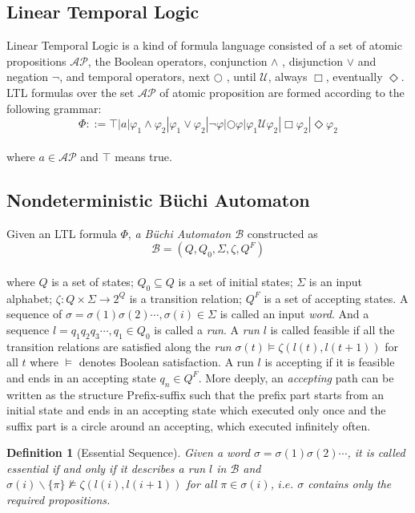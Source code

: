 \documentclass[journal]{IEEEtran}
\newtheorem{definition}{Definition}
\begin{document}
\subsection{Linear Temporal Logic}
Linear Temporal Logic is a kind of formula language consisted of a set of atomic propositions $\mathcal{AP}$, the Boolean operators, conjunction $\land$ , disjunction $\lor$ and negation $\neg$, and temporal operators, next $\bigcirc$ , until $\mathcal{U}$, always $\Box$, eventually $\Diamond$. LTL formulas over the set $\mathcal{AP}$ of atomic proposition are formed according to the following grammar:\\
$$ \varPhi ::= \top  |  a  |  \varphi_1\land\varphi_2   |  \varphi_1\lor\varphi_2   |  \neg\varphi  |   \bigcirc\varphi  | 
  \varphi_1\mathcal{U}\varphi_2 | \Box\varphi_2 |\Diamond\varphi_2  $$\\
where $a\in\mathcal{AP}$ and $\top$ means true.
\subsection{Nondeterministic B\"{u}chi Automaton}
Given an LTL formula $\varPhi$, \emph{a B\"{u}chi Automaton $\mathcal{B} $} constructed as\\
$$\mathcal{B}=(Q,Q_0,\Sigma,\zeta,Q^F)$$\\
where $Q$ is a set of states; $Q_0\subseteq Q$ is a set of initial states; $\Sigma$ is an input alphabet; $\zeta:Q\times\Sigma\rightarrow2^Q$ is a transition relation; $Q^F$ is a set of accepting states.
A sequence of $\sigma=\sigma(1)\sigma(2)\cdots, \sigma(i)\in\Sigma$ is called an input \emph{word}. And a sequence $l=q_1q_2q_3\cdots,q_1\in Q_0$ is called a \emph{run}. A \emph{run} $l$ is called feasible if all the transition relations are satisfied along the \emph{run} $\sigma(t)\models\zeta(l(t),l(t+1))$ for all $t$ where $\models$ denotes Boolean satisfaction. A run $l$ is accepting if it is feasible and ends in an accepting state $q_n\in Q^F$. More deeply, an \emph{accepting} path can be written as the structure Prefix-suffix such that the prefix part starts from an initial state and ends in an accepting state
 which executed only once and the suffix part is a circle around an accepting, which executed infinitely often.
\begin{definition}[Essential Sequence]
	Given a \emph{word} $\sigma=\sigma(1)\sigma(2)\cdots$, it is called \emph{essential} if and only if it describes a run $l$ in $\mathcal{B}$ and $\sigma(i)\backslash\{\pi\}\not\models\zeta(l(i),l(i+1))$ for all $\pi\in\sigma(i)$, $i.e.$ $\sigma$ contains only the required propositions.
\end{definition}
\end{document}
